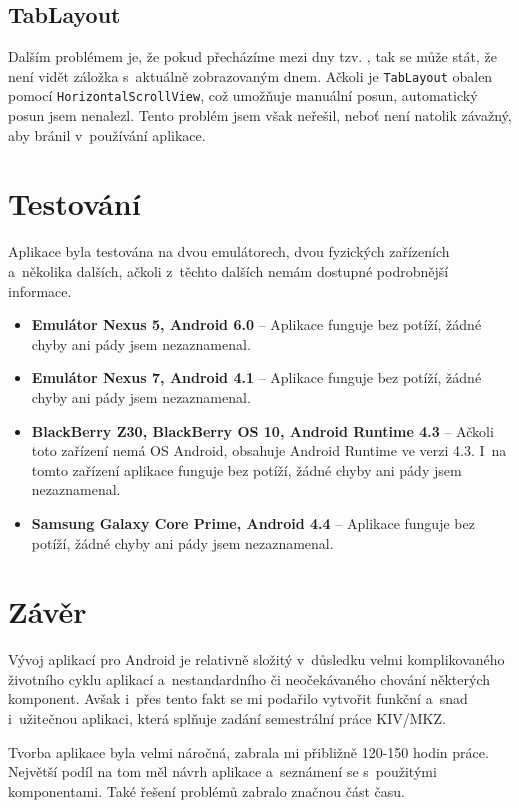 \documentclass[12pt, a4paper]{article}
\begin{document}
		\subsection{TabLayout}
		Dalším problémem je, že pokud přecházíme mezi dny tzv. , tak se může stát, že není vidět záložka s~aktuálně zobrazovaným dnem. Ačkoli je \texttt{TabLayout} obalen pomocí \texttt{HorizontalScrollView}, což umožňuje manuální posun, automatický posun jsem nenalezl. Tento problém jsem však neřešil, neboť není natolik závažný, aby bránil v~používání aplikace.
	
	\section{Testování}
	Aplikace byla testována na dvou emulátorech, dvou fyzických zařízeních a~několika dalších, ačkoli z~těchto dalších nemám dostupné podrobnější informace.
	
		\begin{itemize}
			\item \textbf{Emulátor Nexus 5, Android 6.0} -- Aplikace funguje bez potíží, žádné chyby ani pády jsem nezaznamenal.
			\item \textbf{Emulátor Nexus 7, Android 4.1} -- Aplikace funguje bez potíží, žádné chyby ani pády jsem nezaznamenal.
			\item \textbf{BlackBerry Z30, BlackBerry OS 10, Android Runtime 4.3} -- Ačkoli toto zařízení nemá OS Android, obsahuje Android Runtime ve verzi 4.3. I~na tomto zařízení aplikace funguje bez potíží, žádné chyby ani pády jsem nezaznamenal.
			\item \textbf{Samsung Galaxy Core Prime, Android 4.4} -- Aplikace funguje bez potíží, žádné chyby ani pády jsem nezaznamenal.
		\end{itemize}
	
	\section{Závěr}
	Vývoj aplikací pro Android je relativně složitý v~důsledku velmi komplikovaného životního cyklu aplikací a~nestandardního či neočekávaného chování některých komponent. Avšak i~přes tento fakt se mi podařilo vytvořit funkční a~snad i~užitečnou aplikaci, která splňuje zadání semestrální práce KIV/MKZ.
	
	Tvorba aplikace byla velmi náročná, zabrala mi přibližně 120-150 hodin práce. Největší podíl na tom měl návrh aplikace a~seznámení se s~použitými komponentami. Také řešení problémů zabralo značnou část času.
	
\end{document}
